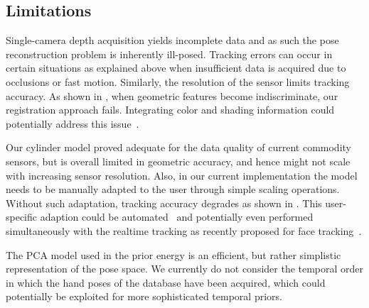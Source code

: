 



\subsection*{Limitations}


Single-camera depth acquisition yields incomplete data and as such the pose reconstruction problem is inherently ill-posed.
Tracking errors can occur in certain situations as explained above when insufficient data is acquired due to occlusions or fast motion.
Similarly, the resolution of the sensor limits tracking accuracy. As shown in , when geometric features become indiscriminate, our registration approach fails. Integrating color and shading information could potentially address this issue~\cite{delagorce2011model}.

Our cylinder model proved adequate for the data quality of current commodity sensors, but is overall limited in geometric accuracy, and hence might not scale with increasing sensor resolution.
Also, in our current implementation the model needs to be manually adapted to the user through simple scaling operations. Without such adaptation, tracking accuracy degrades as shown in .
This user-specific adaption could be automated~\cite{taylor2014user} and potentially even performed simultaneously with the realtime tracking as recently proposed for face tracking~\cite{bouaziz_sig13}.

The PCA model used in the prior energy is an efficient, but rather simplistic representation of the pose space. We currently do not consider the
temporal order in which the hand poses of the database have been acquired, which could potentially be exploited for more sophisticated temporal priors. 


